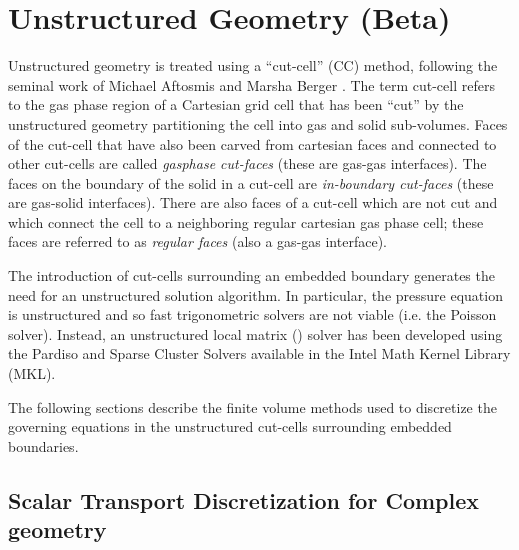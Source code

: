 






\chapter{Unstructured Geometry (Beta)}
\label{sec:unstructured_geometry}

Unstructured geometry is treated using a ``cut-cell'' (CC) method, following the seminal work of Michael Aftosmis and Marsha Berger \cite{Berger:2012,Berger:2017,May:2017}.  The term cut-cell refers to the gas phase region of a Cartesian grid cell that has been ``cut'' by the unstructured geometry partitioning the cell into gas and solid sub-volumes.  Faces of the cut-cell that have also been carved from cartesian faces and connected to other cut-cells are called \emph{gasphase cut-faces} (these are gas-gas interfaces).  The faces on the boundary of the solid in a cut-cell are \emph{in-boundary cut-faces} (these are gas-solid interfaces).  There are also faces of a cut-cell which are not cut and which connect the cell to a neighboring regular cartesian gas phase cell; these faces are referred to as \emph{regular faces} (also a gas-gas interface).

The introduction of cut-cells surrounding an embedded boundary generates the need for an unstructured solution algorithm.  In particular, the pressure equation is unstructured and so fast trigonometric solvers are not viable (i.e. the  Poisson solver).  Instead, an unstructured local matrix () solver has been developed using the Pardiso and Sparse Cluster Solvers available in the Intel Math Kernel Library (MKL).

The following sections describe the finite volume methods used to discretize the governing equations in the unstructured cut-cells surrounding embedded boundaries.

\section{Scalar Transport Discretization for Complex geometry}

